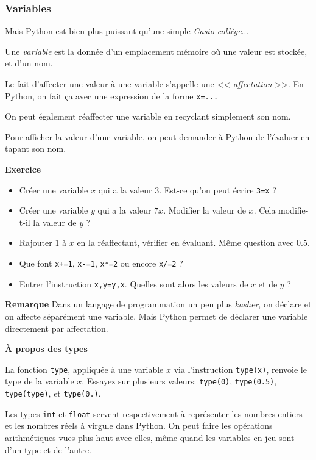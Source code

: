 \documentclass[10pt,xcolor={dvipsnames}]{beamer}
\newcounter{Exercice}
\newenvironment{exo}{
	\refstepcounter{Exercice}
	\begin{block}{\textbf{Exercice~\theExercice}}
	}{\end{block}}
\begin{document}
\begin{frame}[fragile]
\frametitle{Variables}

Mais Python est bien plus puissant qu'une simple \textit{Casio collège}...
\pause

Une \textit{variable} est la donnée d'un emplacement mémoire où une valeur est stockée, et d'un nom.
\pause

Le fait d'affecter une valeur à une variable s'appelle une << \textit{affectation} >>. En Python, on fait ça avec une expression de la forme \lstinline|x=...|	
\pause

On peut également réaffecter une variable en recyclant simplement son nom.
\pause

Pour afficher la valeur d'une variable, on peut demander à Python de l'évaluer en tapant son nom.
\pause
	\begin{exo}
		
		\begin{itemize}[<+->]
		\item Créer une variable $x$ qui a la valeur $3$. Est-ce qu'on peut écrire \lstinline|3=x| ?
		
		\item Créer une variable $y$ qui a la valeur $7x$. Modifier la valeur de $x$. Cela modifie-t-il la valeur de $y$ ?
		
		\item Rajouter $1$ à $x$ en la réaffectant, vérifier en évaluant. Même question avec $0.5$.
		
		\item Que font \lstinline|x+=1|, \lstinline|x-=1|, \lstinline|x*=2| ou encore \lstinline|x/=2| ?
		
		\item Entrer l'instruction \lstinline|x,y=y,x|. Quelles sont alors les valeurs de $x$ et de $y$ ?
		\end{itemize}
		\pause[8]
	\end{exo}
\end{frame}

\begin{frame}[fragile]
	\textbf{Remarque} Dans un langage de programmation un peu plus \textit{kasher}, on déclare et on affecte séparément une variable. Mais Python permet de déclarer une variable directement par affectation.
	\pause
	
	\vspace{1em}
	\textbf{À propos des types}
	
	La fonction \lstinline|type|, appliquée à une variable $x$ via l'instruction \lstinline|type(x)|, renvoie le type de la variable $x$. Essayez sur plusieurs valeurs: \lstinline|type(0)|, \lstinline|type(0.5)|, \lstinline|type(type)|, et \lstinline|type(0.)|.
	\pause
	
	Les types \lstinline|int| et \lstinline|float| servent respectivement à représenter les nombres entiers et les nombres réels à virgule dans Python. On peut faire les opérations arithmétiques vues plus haut avec elles, même quand les variables en jeu sont d'un type et de l'autre.
	
\end{frame}
\end{document}
